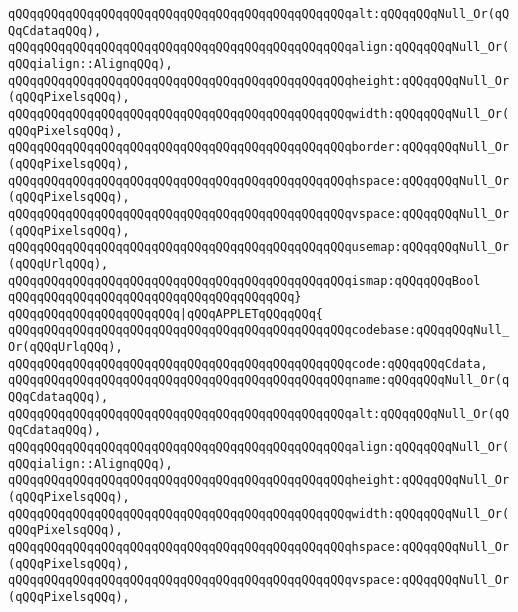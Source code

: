 \verb|qQQqqQQqqQQqqQQqqQQqqQQqqQQqqQQqqQQqqQQqqQQqqQQqalt:qQQqqQQqNull_Or(qQQqCdataqQQq),|\newline
\verb|qQQqqQQqqQQqqQQqqQQqqQQqqQQqqQQqqQQqqQQqqQQqqQQqalign:qQQqqQQqNull_Or(qQQqialign::AlignqQQq),|\newline
\verb|qQQqqQQqqQQqqQQqqQQqqQQqqQQqqQQqqQQqqQQqqQQqqQQqheight:qQQqqQQqNull_Or(qQQqPixelsqQQq),|\newline
\verb|qQQqqQQqqQQqqQQqqQQqqQQqqQQqqQQqqQQqqQQqqQQqqQQqwidth:qQQqqQQqNull_Or(qQQqPixelsqQQq),|\newline
\verb|qQQqqQQqqQQqqQQqqQQqqQQqqQQqqQQqqQQqqQQqqQQqqQQqborder:qQQqqQQqNull_Or(qQQqPixelsqQQq),|\newline
\verb|qQQqqQQqqQQqqQQqqQQqqQQqqQQqqQQqqQQqqQQqqQQqqQQqhspace:qQQqqQQqNull_Or(qQQqPixelsqQQq),|\newline
\verb|qQQqqQQqqQQqqQQqqQQqqQQqqQQqqQQqqQQqqQQqqQQqqQQqvspace:qQQqqQQqNull_Or(qQQqPixelsqQQq),|\newline
\verb|qQQqqQQqqQQqqQQqqQQqqQQqqQQqqQQqqQQqqQQqqQQqqQQqusemap:qQQqqQQqNull_Or(qQQqUrlqQQq),|\newline
\verb|qQQqqQQqqQQqqQQqqQQqqQQqqQQqqQQqqQQqqQQqqQQqqQQqismap:qQQqqQQqBool|\newline
\verb|qQQqqQQqqQQqqQQqqQQqqQQqqQQqqQQqqQQqqQQq}|\newline
\verb|qQQqqQQqqQQqqQQqqQQqqQQq|\verb#|qQQqAPPLETqQQqqQQq{#\newline
\verb|qQQqqQQqqQQqqQQqqQQqqQQqqQQqqQQqqQQqqQQqqQQqqQQqcodebase:qQQqqQQqNull_Or(qQQqUrlqQQq),|\newline
\verb|qQQqqQQqqQQqqQQqqQQqqQQqqQQqqQQqqQQqqQQqqQQqqQQqcode:qQQqqQQqCdata,|\newline
\verb|qQQqqQQqqQQqqQQqqQQqqQQqqQQqqQQqqQQqqQQqqQQqqQQqname:qQQqqQQqNull_Or(qQQqCdataqQQq),|\newline
\verb|qQQqqQQqqQQqqQQqqQQqqQQqqQQqqQQqqQQqqQQqqQQqqQQqalt:qQQqqQQqNull_Or(qQQqCdataqQQq),|\newline
\verb|qQQqqQQqqQQqqQQqqQQqqQQqqQQqqQQqqQQqqQQqqQQqqQQqalign:qQQqqQQqNull_Or(qQQqialign::AlignqQQq),|\newline
\verb|qQQqqQQqqQQqqQQqqQQqqQQqqQQqqQQqqQQqqQQqqQQqqQQqheight:qQQqqQQqNull_Or(qQQqPixelsqQQq),|\newline
\verb|qQQqqQQqqQQqqQQqqQQqqQQqqQQqqQQqqQQqqQQqqQQqqQQqwidth:qQQqqQQqNull_Or(qQQqPixelsqQQq),|\newline
\verb|qQQqqQQqqQQqqQQqqQQqqQQqqQQqqQQqqQQqqQQqqQQqqQQqhspace:qQQqqQQqNull_Or(qQQqPixelsqQQq),|\newline
\verb|qQQqqQQqqQQqqQQqqQQqqQQqqQQqqQQqqQQqqQQqqQQqqQQqvspace:qQQqqQQqNull_Or(qQQqPixelsqQQq),|\newline
